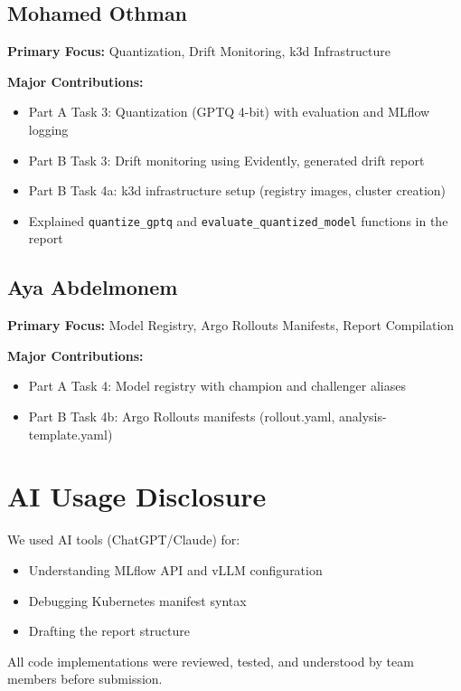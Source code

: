 \documentclass[11pt,a4paper]{article}
\begin{document}
\subsection{Mohamed Othman}

\textbf{Primary Focus:} Quantization, Drift Monitoring, k3d Infrastructure

\textbf{Major Contributions:}
\begin{itemize}
\item Part A Task 3: Quantization (GPTQ 4-bit) with evaluation and MLflow logging
\item Part B Task 3: Drift monitoring using Evidently, generated drift report
\item Part B Task 4a: k3d infrastructure setup (registry images, cluster creation)
\item Explained \texttt{quantize\_gptq} and \texttt{evaluate\_quantized\_model} functions in the report
\end{itemize}

\subsection{Aya Abdelmonem}

\textbf{Primary Focus:} Model Registry, Argo Rollouts Manifests, Report Compilation

\textbf{Major Contributions:}
\begin{itemize}
\item Part A Task 4: Model registry with champion and challenger aliases
\item Part B Task 4b: Argo Rollouts manifests (rollout.yaml, analysis-template.yaml)
\end{itemize}

\section{AI Usage Disclosure}

We used AI tools (ChatGPT/Claude) for:
\begin{itemize}
\item Understanding MLflow API and vLLM configuration
\item Debugging Kubernetes manifest syntax
\item Drafting the report structure
\end{itemize}

All code implementations were reviewed, tested, and understood by team members before submission.
\end{document}
